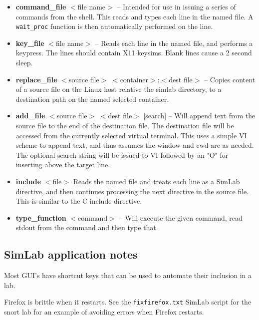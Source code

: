 \documentclass[12pt]{article}
\begin{document}
\begin{itemize}
\item \textbf{command\_file} $<$file name$>$ -- Intended for use in issuing a series of
commands from the shell.  This reads and types each line in the named file.
A {\tt wait\_proc} function is then automatically performed on the line.
\item \textbf{key\_file} $<$file name$>$ -- Reads each line in the named file, and performs
a keypress.  The lines should contain X11 keysims.  Blank lines cause a 2 second sleep.
\item \textbf{replace\_file} $<$source file$>$ $<$container$>$:$<$dest file$>$ -- Copies content of a source
file on the Linux host relative the simlab directory, to a destination path on the named selected container.  
\item \textbf{add\_file} $<$source file$>$ $<$dest file$>$ [search] -- Will append text from the source file to the 
end of the destination file.  The destination file will be accessed from the currently selected virtual
terminal.  This uses a simple VI scheme to append text, and thus assumes the window and cwd are as needed.  The optional
search string will be issued to VI followed by an "O" for inserting above the target line.
\item \textbf{include} $<$file$>$ Reads the named file and treats each line as a SimLab directive,
and then continues processing the next directive in the source file.  This is similar to the C
include directive.
\item \textbf{type\_function} $<$command$>$ -- Will execute the given command, read stdout from the 
command and then type that.

\end{itemize}
\subsection{SimLab application notes}
\label{simlab_notes}
Most GUI's have shortcut keys that can be used to automate their inclusion in a lab.

Firefox is brittle when it restarts.  See the {\tt fixfirefox.txt} SimLab script for the snort lab
for an example of avoiding errors when Firefox restarts.
\end{document}
